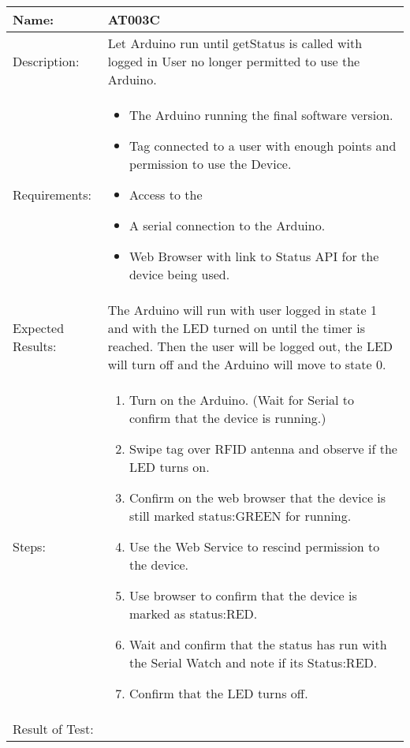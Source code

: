 \begin{table}[h]
	\centering
		\begin{tabular*}{\textwidth}{|l|l|}
		\hline
		\hline
		Name: & AT003C\\
		\hline
		Description: & Let Arduino run until getStatus is called with logged in User no longer permitted to use the Arduino.\\
		\hline
		Requirements: & \parbox{0.85\textwidth}{
		\begin{itemize}
			\item The Arduino running the final software version.
			\item Tag connected to a user with enough points and permission to use the Device.
			\item Access to the 
			\item A serial connection to the Arduino.
			\item Web Browser with link to Status API for the device being used.
		\end{itemize}}
		\\
		\hline
		Expected Results: & \parbox{.85\textwidth}{The Arduino will run with user logged in state 1 and with the LED turned on until the timer is reached. 
		Then the user will be logged out, the LED will turn off and the Arduino will move to state 0.}\\
		\hline
		Steps: & \parbox{.85\textwidth}{
		\begin{enumerate}
			\item Turn on the Arduino. (Wait for Serial to confirm that the device is running.)
			\item Swipe tag  over RFID antenna and observe if the LED turns on.
			\item Confirm on the web browser that the device is still marked status:GREEN for running.
			\item Use the Web Service to rescind permission to the device.
			\item Use browser to confirm that the device is marked as status:RED.
			\item Wait and confirm that the status has run with the Serial Watch and note if its Status:RED.
			\item Confirm that the LED turns off.
		\end{enumerate}}
		\\		
		\hline
		Result of Test: & \\
		\hline
		\end{tabular*}
\end{table}